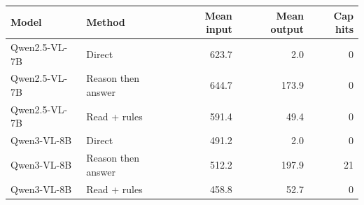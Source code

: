 \begin{tabular}{llrrr}
\toprule
Model & Method & Mean input & Mean output & Cap hits \\
\midrule
Qwen2.5-VL-7B & Direct & 623.7 & 2.0 & 0 \\
Qwen2.5-VL-7B & Reason then answer & 644.7 & 173.9 & 0 \\
Qwen2.5-VL-7B & Read + rules & 591.4 & 49.4 & 0 \\
Qwen3-VL-8B & Direct & 491.2 & 2.0 & 0 \\
Qwen3-VL-8B & Reason then answer & 512.2 & 197.9 & 21 \\
Qwen3-VL-8B & Read + rules & 458.8 & 52.7 & 0 \\
\bottomrule
\end{tabular}
